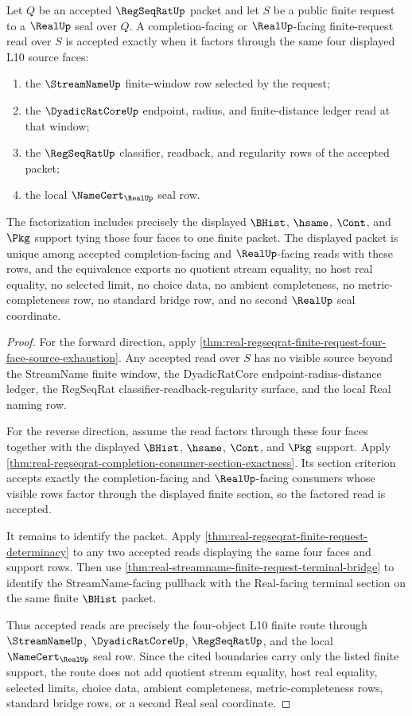 \begin{theorem}
\label{thm:real-regseqrat-finite-request-route-equivalence}
Let $Q$ be an accepted $\RegSeqRatUp$ packet and let $S$ be a public finite request to a $\RealUp$ seal over $Q$. A completion-facing or $\RealUp$-facing finite-request read over $S$ is accepted exactly when it factors through the same four displayed L10 source faces:
\begin{enumerate}
\item the $\StreamNameUp$ finite-window row selected by the request;
\item the $\DyadicRatCoreUp$ endpoint, radius, and finite-distance ledger read at that window;
\item the $\RegSeqRatUp$ classifier, readback, and regularity rows of the accepted packet;
\item the local $\NameCert_{\RealUp}$ seal row.
\end{enumerate}
The factorization includes precisely the displayed $\BHist$, $\hsame$, $\Cont$, and $\Pkg$ support tying those four faces to one finite packet. The displayed packet is unique among accepted completion-facing and $\RealUp$-facing reads with these rows, and the equivalence exports no quotient stream equality, no host real equality, no selected limit, no choice data, no ambient completeness, no metric-completeness row, no standard bridge row, and no second $\RealUp$ seal coordinate.
\end{theorem}
\begin{proof}
For the forward direction, apply \autoref{thm:real-regseqrat-finite-request-four-face-source-exhaustion}. Any accepted read over $S$ has no visible source beyond the StreamName finite window, the DyadicRatCore endpoint-radius-distance ledger, the RegSeqRat classifier-readback-regularity surface, and the local Real naming row.

For the reverse direction, assume the read factors through these four faces together with the displayed $\BHist$, $\hsame$, $\Cont$, and $\Pkg$ support. Apply \autoref{thm:real-regseqrat-completion-consumer-section-exactness}. Its section criterion accepts exactly the completion-facing and $\RealUp$-facing consumers whose visible rows factor through the displayed finite section, so the factored read is accepted.

It remains to identify the packet. Apply \autoref{thm:real-regseqrat-finite-request-determinacy} to any two accepted reads displaying the same four faces and support rows. Then use \autoref{thm:real-streamname-finite-request-terminal-bridge} to identify the StreamName-facing pullback with the Real-facing terminal section on the same finite $\BHist$ packet.

Thus accepted reads are precisely the four-object L10 finite route through $\StreamNameUp$, $\DyadicRatCoreUp$, $\RegSeqRatUp$, and the local $\NameCert_{\RealUp}$ seal row. Since the cited boundaries carry only the listed finite support, the route does not add quotient stream equality, host real equality, selected limits, choice data, ambient completeness, metric-completeness rows, standard bridge rows, or a second Real seal coordinate.
\end{proof}

